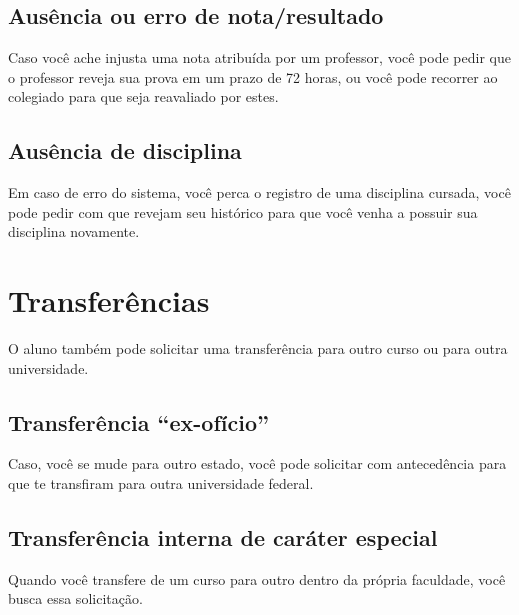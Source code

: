 \subsection{ Ausência ou erro de nota/resultado}
Caso você ache injusta uma nota atribuída por um professor, você pode pedir que o professor reveja sua prova em um prazo de 72 horas, ou você pode recorrer ao colegiado para que seja reavaliado por estes.
                    
\subsection{ Ausência de disciplina}
Em caso de erro do sistema, você perca o registro de uma disciplina cursada, você pode pedir com que revejam seu histórico para que você venha a possuir sua disciplina novamente.

\section{Transferências}
O aluno também pode solicitar uma transferência para outro curso ou para outra universidade.

\subsection{Transferência ``ex-ofício''}

Caso, você se mude para outro estado, você pode solicitar com antecedência para que te transfiram para outra universidade federal.

\subsection{Transferência interna de caráter especial}
Quando você transfere de um curso para outro dentro da própria faculdade, você busca essa solicitação.
